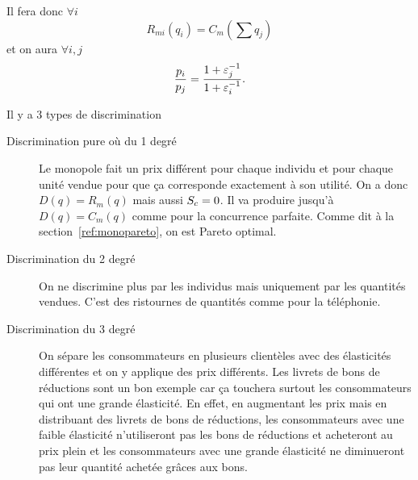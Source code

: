 Il fera donc $\forall i$
\[ R_{mi}(q_i) = C_m(\sum q_j) \]
et on aura $\forall i,j$
\[ \frac{p_i}{p_j} = \frac{1+\varepsilon_j^{-1}}{1+\varepsilon_i^{-1}}. \]

Il y a 3 types de discrimination
\begin{description}
  \item[Discrimination pure où du 1\ier{} degré]
    Le monopole fait un prix différent pour chaque individu et pour chaque
    unité vendue pour que ça corresponde exactement à son utilité.
    On a donc $D(q) = R_m(q)$ mais aussi ${S_c} = 0$.
    Il va produire jusqu'à $D(q) = C_m(q)$ comme pour la concurrence
    parfaite.
    Comme dit à la section~\ref{ref:monopareto},
    on est Pareto optimal.
  \item[Discrimination du 2\ieme{} degré]
    On ne discrimine plus par les individus mais uniquement par les quantités
    vendues.
    C'est des ristournes de quantités comme pour la téléphonie.
  \item[Discrimination du 3\ieme{} degré]
    On sépare les consommateurs en plusieurs clientèles avec des élasticités
    différentes et on y applique des prix différents.
    Les livrets de bons de réductions sont un bon exemple car
    ça touchera surtout les consommateurs qui ont une grande élasticité.
    En effet, en augmentant les prix mais en distribuant des livrets
    de bons de réductions, les consommateurs avec une faible élasticité
    n'utiliseront pas les bons de réductions et acheteront au prix plein
    et les consommateurs avec une grande élasticité ne diminueront pas
    leur quantité achetée grâces aux bons.
\end{description}

